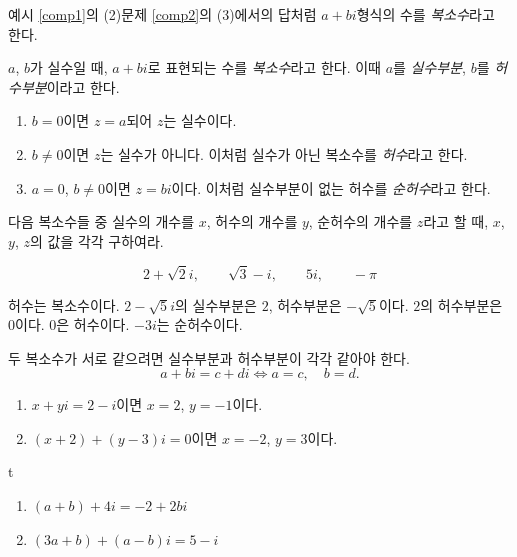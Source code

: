 \documentclass{oblivoir}
\begin{document}
\bigskip
예시 \ref{comp1}의 (2)\와 문제 \ref{comp2}의 (3)에서의 답처럼 \(a+bi\)형식의 수를 \emph{복소수}라고 한다.

%
\begin{mdframed}
\(a\), \(b\)가 실수일 때, \(a+bi\)로 표현되는 수를 \emph{복소수}라고 한다.
이때 \(a\)를 \emph{실수부분}, \(b\)를 \emph{허수부분}이라고 한다.
\end{mdframed}

%
\begin{enumerate}
\item
\(b=0\)이면 \(z=a\)\가 되어 \(z\)는 실수이다.
\item
\(b\neq0\)이면 \(z\)는 실수가 아니다.
이처럼 실수가 아닌 복소수를 \emph{허수}라고 한다.
\item
\(a=0\), \(b\neq0\)이면 \(z=bi\)이다.
이처럼 실수부분이 없는 허수를 \emph{순허수}라고 한다.
\end{enumerate}

%
\prob{}\label{comp3}
다음 복소수들 중 실수의 개수를 \(x\), 허수의 개수를 \(y\), 순허수의 개수를 \(z\)라고 할 때, \(x\), \(y\), \(z\)의 값을 각각 구하여라.
\begin{mdframed}[innertopmargin=0pt,leftmargin=60pt,rightmargin=60pt]
\[2+\sqrt2i,\qquad\sqrt3-i,\qquad5i,\qquad-\pi\]
\end{mdframed}
\bigskip

%
\label{comp4}
\par\vspace{-20pt}
\tabd
{허수는 복소수이다.}
{\(2-\sqrt5i\)의 실수부분은 \(2\), 허수부분은 \(-\sqrt5\)이다.}
{\(2\)의 허수부분은 \(0\)이다.}
{\(0\)은 허수이다.}
{\(-3i\)는 순허수이다.}

%
\begin{mdframed}
두 복소수가 서로 같으려면 실수부분과 허수부분이 각각 같아야 한다.
\[a+bi=c+di\iff a=c,\quad b=d.\]
\end{mdframed}

%
\exam{}
\begin{enumerate}
\item
\(x+yi=2-i\)이면 \(x=2\), \(y=-1\)이다.
\item
\((x+2)+(y-3)i=0\)이면 \(x=-2\), \(y=3\)이다.
\end{enumerate}
t
%
\begin{enumerate}\label{comp5}
\item
\((a+b)+4i=-2+2bi\)
\item
\((3a+b)+(a-b)i=5-i\)
\end{enumerate}
\end{document}

